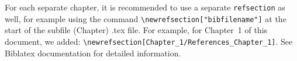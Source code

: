 \documentclass[main_brownies.tex]{subfiles}
\begin{document}
For each separate chapter, it is recommended to use a separate \verb*|refsection| as well, for example using the command \verb*|\newrefsection["bibfilename"]| at the start of the subfile (Chapter) .tex file. For example, for Chapter~1 of this document, we added: \verb*|\newrefsection[Chapter_1/References_Chapter_1]|. See Biblatex documentation for detailed information.\cite{BiblatexDocumentation}


{\raggedright
	\printbibliography} %
\end{document}
